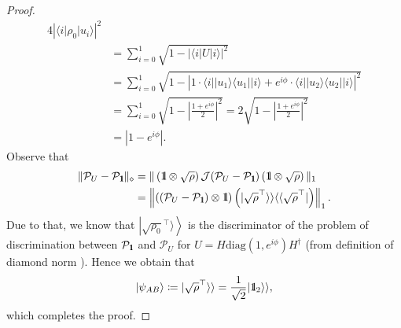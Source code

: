 \documentclass[preprint,12pt, a4paper]{elsarticle}
\newcommand{\ket}[1]{\ensuremath{|#1\rangle}}
\newcommand{\bra}[1]{\ensuremath{\langle#1|}}
\newcommand{\ketbra}[2]{\ensuremath{\ket{#1}\bra{#2}}}
\newcommand{\proj}[1]{\ensuremath{\ketbra{#1}{#1}}}
\newcommand{\1}{{\rm 1\hspace{-0.9mm}l}}
\newcommand{\Id}{{\rm 1\hspace{-0.9mm}l}}
\newcommand{\PP}{\mathcal{P}}
\newcommand{\diag}{\mathrm{diag}}
\newtheorem{remark}{Remark}
\begin{document}
\begin{proof}
\begin{equation}
\begin{split}
{	4|\bra{i}\rho_0\ket{u_i}|^2}  \\
&= \sum_{i=0}^1  \sqrt{ 1 -  \left| \bra{i}  U \ket{i }\right|^2} 
\\ 
&=\sum_{i=0}^1  \sqrt{1 -  \left| 1 \cdot \bra{i} \proj{u_1} 
	\ket{i} + e^{i \phi} \cdot\bra{i}  \proj{u_2}\ket{i}\right|^2} \\
&= \sum_{i=0}^1 
 \sqrt{1 -\left| \frac{1+ e^{i \phi}}{2}\right|^2 } 
= 2 \sqrt{1 -\left| \frac{1+e^{i \phi}}{2}\right|^2 } \\
&= |1-e^{i \phi }|.
\end{split}
\end{equation}
Observe that
\begin{equation}
\begin{split}
\| \PP_{U} - \PP_{\Id}  \|_\diamond  
&=  \| \left( \Id \otimes \sqrt{\rho} \right) \mathcal{J}(\PP_{U} - \PP_{\Id} )  \left( 
\Id \otimes \sqrt{\rho} \right) \|_1 \\
&= \left\| ( (\PP_{U} - \PP_\Id) \otimes \Id) \left(  | \sqrt{\rho}^\top 
\rangle \rangle \langle \langle \sqrt{\rho}^\top | \right) \right\|_1.
\end{split}
\end{equation}
Due to that, we know  
that $\left| \sqrt{\rho_0}^{\top} \rangle \right\rangle$ is the discriminator of the problem 
of discrimination between 
$\PP_{\Id} $ and $\PP_U$ for 
$ U =  H \diag(1, e^{i \phi}) H^\dagger$ (from definition of diamond norm 
).      Hence we obtain that \begin{equation}
\ket{\psi_{AB}} \coloneqq   | \sqrt{\rho}^\top \rangle \rangle = \frac{1}{\sqrt{2} } | 
\Id_2 \rangle \rangle,
\end{equation}
which completes the proof.
\end{proof}


%
%
\end{document}
